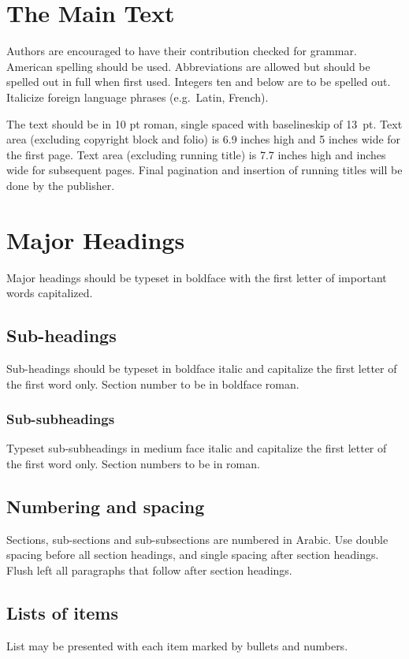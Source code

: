 \documentclass{ws-ijtaf}
\begin{document}
\section{The Main Text}
Authors are encouraged to have their contribution checked for grammar.
American spelling should be used. Abbreviations are allowed but should
be spelled out in full when first used. Integers ten and below are to be
spelled out. Italicize foreign language phrases (e.g.~Latin, French).

The text should be in 10 pt roman, single spaced with
baselineskip of 13~pt. Text area (excluding copyright block and folio)
is 6.9 inches high and 5 inches wide for the first page.
Text area (excluding running title) is 7.7 inches high and inches wide for subsequent pages.  Final pagination and
insertion of running titles will be done by the publisher.

\section{Major Headings}
Major headings should be typeset in boldface with the first letter of
important words capitalized.

\subsection{Sub-headings}
Sub-headings should be typeset in boldface italic and capitalize the
first letter of the first word only. Section number to be in boldface
roman.

\subsubsection{Sub-subheadings}
Typeset sub-subheadings in medium face italic and capitalize the first
letter of the first word only. Section numbers to be in roman.

\subsection{Numbering and spacing}
Sections, sub-sections and sub-subsections are numbered in Arabic.
Use double spacing before all section headings, and single spacing
after section headings. Flush left all paragraphs that follow after
section headings.

\subsection{Lists of items}
List may be presented with each item marked by bullets and numbers.
\end{document}
